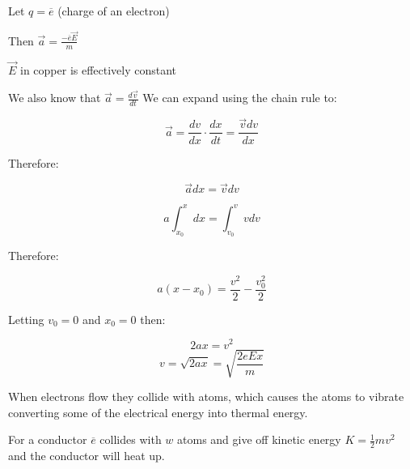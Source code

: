 \documentclass{report}
\begin{document}
\begin{description}
\begin{mdframed}
            Let $q = \overline{e}$ (charge of an electron)

            Then $\vec{a} =\frac{-\overline{e} \vec{E}}{m}$ 

            $\vec{E}$ in copper is effectively constant

            We also know that  $\vec{a} = \frac{d\vec{v}}{dt}$
            We can expand using the chain rule to:

             \begin{displaymath}
                \vec{a} = \frac{dv}{dx} \cdot \frac{dx}{dt}
                = \frac{\vec{v}dv}{dx}
            \end{displaymath}

            Therefore:

            \begin{displaymath}
                \vec{a}dx = \vec{v}dv
            \end{displaymath}

            \begin{displaymath}
                a \int_{x_0}^{x} dx = \int_{v_0}^v v dv
            \end{displaymath}

            Therefore:

            \begin{displaymath}
                a(x-x_0) = \frac{v^2}{2} - \frac{v_0^2}{2}
            \end{displaymath}

            Letting $v_0 = 0$ and $x_0 = 0$ then:

            \begin{displaymath}
                2ax = v^2
            \end{displaymath}
            \begin{displaymath}
                v = \sqrt{2ax}
                = \sqrt{\frac{2eEx}{m}}
            \end{displaymath}
        \end{mdframed}
        \begin{mdframed}
            When electrons flow they collide with atoms,
            which causes the atoms to vibrate converting
            some of the electrical energy into thermal
            energy.

            For a conductor $\overline{e}$ collides with $w$
            atoms and give off kinetic energy  $K = \frac{1}{2}mv^2$
            and the conductor will heat up.


\end{mdframed}
\end{description}
\end{document}
